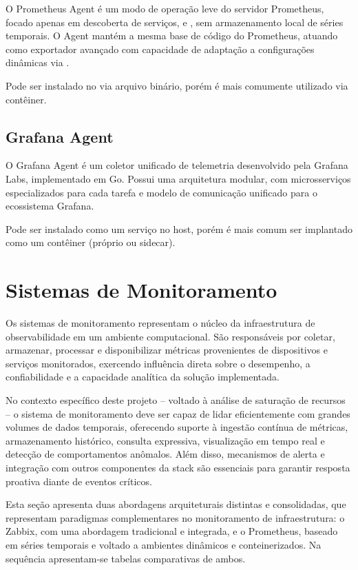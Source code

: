 O Prometheus Agent \citep{promagent2025} é um modo de operação leve do servidor Prometheus, focado apenas em descoberta de serviços,  e , sem armazenamento local de séries temporais. O Agent mantém a mesma base de código do Prometheus, atuando como exportador avançado com capacidade de adaptação a configurações dinâmicas via .

Pode ser instalado no  via arquivo binário, porém é mais comumente utilizado via contêiner.

\subsection{Grafana Agent}
\label{subsection:GrafanaAgent}

O Grafana Agent \citep{grafanaagent2025} é um coletor unificado de telemetria desenvolvido pela Grafana Labs, implementado em Go. Possui uma arquitetura modular, com microsserviços especializados para cada tarefa e modelo de comunicação  unificado para o ecossistema Grafana.

Pode ser instalado como um serviço no host, porém é mais comum ser implantado como um contêiner (próprio ou sidecar).


\section{Sistemas de Monitoramento}
\label{section:SistemasMonitoramento}

Os sistemas de monitoramento representam o núcleo da infraestrutura de observabilidade em um ambiente computacional. São responsáveis por coletar, armazenar, processar e disponibilizar métricas provenientes de dispositivos e serviços monitorados, exercendo influência direta sobre o desempenho, a confiabilidade e a capacidade analítica da solução implementada.

No contexto específico deste projeto -- voltado à análise de saturação de recursos -- o sistema de monitoramento deve ser capaz de lidar eficientemente com grandes volumes de dados temporais, oferecendo suporte à ingestão contínua de métricas, armazenamento histórico, consulta expressiva, visualização em tempo real e detecção de comportamentos anômalos. Além disso, mecanismos de alerta e integração com outros componentes da stack são essenciais para garantir resposta proativa diante de eventos críticos.

Esta seção apresenta duas abordagens arquiteturais distintas e consolidadas, que representam paradigmas complementares no monitoramento de infraestrutura: o Zabbix, com uma abordagem tradicional e integrada, e o Prometheus, baseado em séries temporais e voltado a ambientes dinâmicos e conteinerizados. Na sequência apresentam-se tabelas comparativas de ambos.

